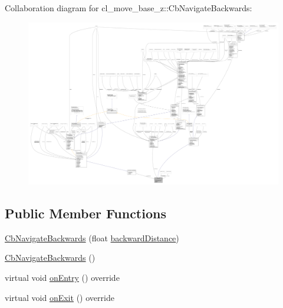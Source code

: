 Collaboration diagram for cl\+\_\+move\+\_\+base\+\_\+z\+:\+:Cb\+Navigate\+Backwards\+:
\nopagebreak
\begin{figure}[H]
\begin{center}
\leavevmode
\includegraphics[width=350pt]{classcl__move__base__z_1_1CbNavigateBackwards__coll__graph}
\end{center}
\end{figure}
\subsection*{Public Member Functions}
\begin{DoxyCompactItemize}
\item 
\hyperlink{classcl__move__base__z_1_1CbNavigateBackwards_aed93fbbdf28501d068ca4acb6a225d27}{Cb\+Navigate\+Backwards} (float \hyperlink{classcl__move__base__z_1_1CbNavigateBackwards_abb7099e4e18602f6cf06c4f5534a2a15}{backward\+Distance})
\item 
\hyperlink{classcl__move__base__z_1_1CbNavigateBackwards_a1329e851a242a12e80c6364c02651b70}{Cb\+Navigate\+Backwards} ()
\item 
virtual void \hyperlink{classcl__move__base__z_1_1CbNavigateBackwards_a545a5282f0ef6b0080b46002d6037567}{on\+Entry} () override
\item 
virtual void \hyperlink{classcl__move__base__z_1_1CbNavigateBackwards_a92858e20e6401051203f5dfa4aef60dc}{on\+Exit} () override
\end{DoxyCompactItemize}
